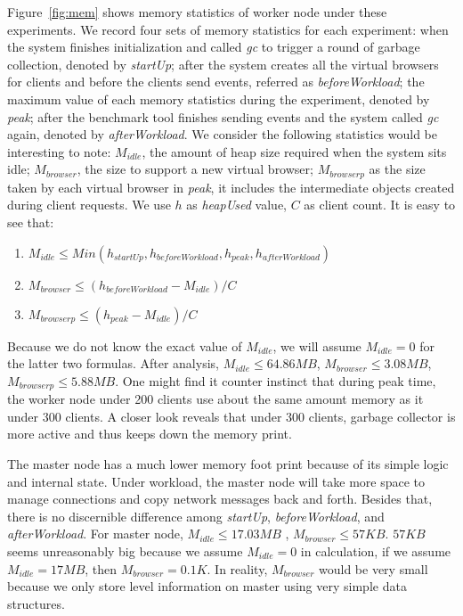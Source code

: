 Figure~\ref{fig:mem} shows memory statistics of worker node under these experiments.
We record four sets of memory statistics for each experiment: 
when the system finishes initialization and called \emph{gc} to trigger a round of garbage collection,
denoted by \emph{startUp};
after the system creates all the virtual browsers for clients and before the clients send 
events, referred as \emph{beforeWorkload};
the maximum value of each memory statistics during the experiment, denoted by \emph{peak};
after the benchmark tool finishes sending events and the system called \emph{gc} again,
denoted by \emph{afterWorkload}.
We consider the following statistics would be interesting to note:
$M_{idle}$, the amount of heap size required when the system sits idle;
$M_{browser}$, the size to support a new virtual browser;
$M_{browserp}$ as the size taken by each virtual browser in \emph{peak}, 
it includes the intermediate objects created during client requests.
We use $h$ as \emph{heapUsed} value, $C$ as client count.
It is easy to see that:
\begin{enumerate}
\item $M_{idle} \leq Min(h_{startUp}, h_{beforeWorkload}, h_{peak}, h_{afterWorkload})$
\item $M_{browser} \leq (h_{beforeWorkload} - M_{idle})/C$
\item $M_{browserp} \leq (h_{peak} - M_{idle})/C$
\end{enumerate}
Because we do not know the exact value of $M_{idle}$, 
we will assume $M_{idle}=0$ for the latter two formulas.
After analysis, $M_{idle} \leq 64.86MB$, $M_{browser} \leq 3.08MB$, $M_{browserp} \leq 5.88MB$.
One might find it counter instinct that during peak time,
the worker node under 200 clients use about the same amount memory as it under 300 clients.
A closer look reveals that under 300 clients, 
garbage collector is more active and thus keeps down the memory print.

The master node has a much lower memory foot print because of its simple logic
and internal state.
Under workload, the master node will take more space to manage connections and
copy network messages back and forth.
Besides that, there is no discernible difference among \emph{startUp}, \emph{beforeWorkload},
and \emph{afterWorkload}.
For master node,
$M_{idle} \leq 17.03MB$ , $M_{browser} \leq 57KB$.
$57KB$ seems unreasonably big because we assume $M_{idle}=0$ in calculation,
if we assume $M_{idle}=17MB$, then $M_{browser} = 0.1K$. 
In reality, $M_{browser}$ would be very small because we only store \appins{}
level information on master using very simple data structures.

